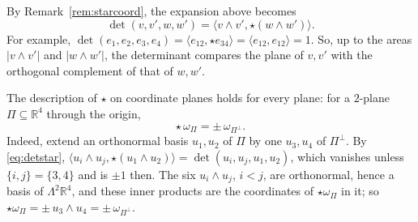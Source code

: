 By Remark~\ref{rem:starcoord}, the expansion above becomes
\begin{equation}
  \label{eq:detstar}
  \det(v, v', w, w') = \langle v \wedge v', \star(w \wedge w')\rangle.
\end{equation}
For example, $\det(e_{1}, e_{2}, e_{3}, e_{4}) = \langle e_{12}, \star
e_{34}\rangle = \langle e_{12}, e_{12}\rangle = 1$. So, up to the areas
$|v \wedge v'|$ and $|w \wedge w'|$, the determinant compares the plane of
$v, v'$ with the orthogonal complement of that of $w, w'$.

\begin{remark}
  The description of $\star$ on coordinate planes holds for every plane: for
  a $2$-plane $\Pi \subseteq \mathbb{R}^{4}$ through the origin,
  \begin{equation}
    \label{eq:starplane}
    \star\,\omega_{\Pi} = \pm\,\omega_{\Pi^{\perp}}.
  \end{equation}
  Indeed, extend an orthonormal basis $u_{1}, u_{2}$ of $\Pi$ by one $u_{3},
  u_{4}$ of $\Pi^{\perp}$. By \eqref{eq:detstar}, $\langle u_{i} \wedge u_{j},
  \star(u_{1} \wedge u_{2})\rangle = \det(u_{i}, u_{j}, u_{1}, u_{2})$, which
  vanishes unless $\{i, j\} = \{3, 4\}$ and is $\pm 1$ then. The six
  $u_{i} \wedge u_{j}$, $i < j$, are orthonormal, hence a basis of
  $\Lambda^{2}\mathbb{R}^{4}$, and these inner products are the coordinates
  of $\star\omega_{\Pi}$ in it; so $\star\omega_{\Pi} = \pm\, u_{3} \wedge
  u_{4} = \pm\,\omega_{\Pi^{\perp}}$.
\end{remark}
